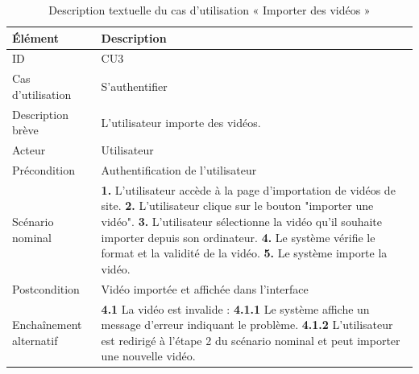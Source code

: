 \begin{table}[h!]
    \centering
    \renewcommand{\arraystretch}{1.25} %
    \setlength{\arrayrulewidth}{1pt} %
    \begin{tabular}{p{} p{}}    
    \toprule
    \textbf{Élément} & \textbf{Description} \\
    \midrule
    ID & CU3 \\ \hline
    Cas d'utilisation & S'authentifier \\ \hline
    Description brève & L'utilisateur importe des vidéos. \\ \hline
    Acteur & Utilisateur \\ \hline
    Précondition & Authentification de l'utilisateur \\ \hline
    Scénario nominal & 
        \textbf{1.} L'utilisateur accède à la page d'importation de vidéos de site. \newline
        \textbf{2.} L'utilisateur clique sur le bouton "importer une vidéo". \newline
        \textbf{3.} L'utilisateur sélectionne la vidéo qu'il souhaite importer depuis son ordinateur. \newline
        \textbf{4.} Le système vérifie le format et la validité de la vidéo. \newline
        \textbf{5.} Le système importe la vidéo. \\ \hline
    Postcondition & Vidéo importée et affichée dans l'interface \\ \hline
    Enchaînement alternatif & \textbf{4.1} La vidéo est invalide : \newline 
        \textbullet{} \textbf{4.1.1} Le système affiche un message d'erreur indiquant le problème. \newline
        \textbullet{} \textbf{4.1.2} L'utilisateur est redirigé à l'étape 2 du scénario nominal et peut importer une nouvelle vidéo. \\
    \bottomrule
    \end{tabular} 
    \caption{Description textuelle du cas d’utilisation « Importer des vidéos »}
    \label{tab:t4}
\end{table}
